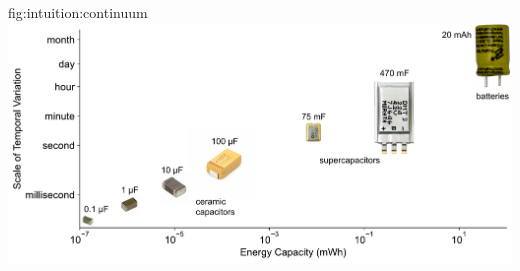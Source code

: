 \begin{definefigure}{fig:intuition:continuum}
    \centering
    \includegraphics[width=\columnwidth]{figs/chap3/continuum.pdf}
    \caption{
    The continuum of the efficacy of energy storage technologies for averaging and filtering power at different temporal scales.
    Small energy buffers filter out high frequency power supply noise and spikes, while
    larger energy capacities filter out power variance on larger temporal scales.
    }
\end{definefigure}

